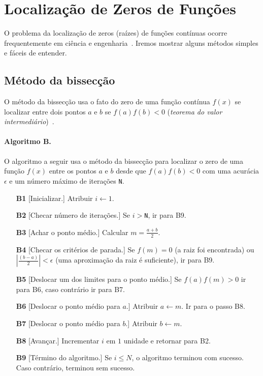 \section*{Localização de Zeros de Funções}

O problema da localização de zeros (raízes) 
de funções contínuas ocorre frequentemente 
em ciência e engenharia~\cite{hamming}.
Iremos mostrar alguns métodos simples 
e fáceis de entender.

\subsection*{Método da bissecção}

O método da bissecção usa o fato do zero de uma 
função contínua $f(x)$ se localizar entre dois 
pontos $a$ e $b$ se $f(a)f(b)<0$ 
({\it teorema do valor intermediário\/})~\cite{numrec}.

\paragraph{Algoritmo B.}
O algoritmo a seguir usa o método da bissecção para 
localizar o zero de uma função $f(x)$ 
entre os pontos $a$ e $b$ desde que $f(a)f(b)<0$ 
com uma acurácia $\epsilon$ e um número máximo 
de iterações {\tt N}.

\begin{itemize}
\item[\bf B1] [Inicializar.] Atribuir $i \leftarrow 1$.
\item[\bf B2] [Checar número de iterações.] Se $i>${\tt N}, 
		ir para B9.

	\item[\bf B3] [Achar o ponto médio.] Calcular $m = \frac{a+b}{2}$.

\item[\bf B4] [Checar os critérios de parada.] Se $f(m)=0$
	(a raiz foi encontrada)
		ou \hbox{$|\frac{(b-a)}{2}| < \epsilon$} (uma aproximação da
	raiz é suficiente), ir para B9.

\item[\bf B5] [Deslocar um dos limites para o ponto médio.]
	Se $f(a)f(m)>0$ ir para B6, caso contrário 
	ir para B7.

\item[\bf B6] [Deslocar o ponto médio para $a$.] Atribuir
	$a\leftarrow m$. Ir para o passo B8.

\item[\bf B7] [Deslocar o ponto médio para $b$.] Atribuir
	$b\leftarrow m$.

\item[\bf B8] [Avançar.] Incrementar $i$ em $1$ unidade e
	retornar para B2.

\item[\bf B9] [Término do algoritmo.] Se $i\leq N$, o algoritmo
	terminou com sucesso. Caso contrário, terminou 
	sem sucesso.\quad\pfbox
\end{itemize}

